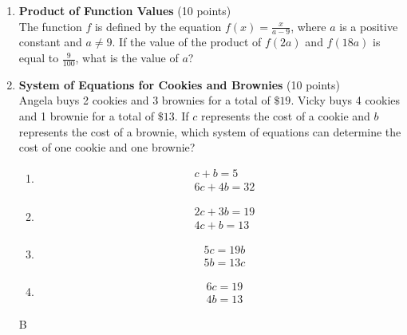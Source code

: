 \begin{enumerate}
  \item \textbf{Product of Function Values} (10 points)\\
  The function $f$ is defined by the equation $f(x) = \frac{x}{a-9}$, where $a$ is a positive constant and $a \neq 9$. If the value of the product of $f(2a)$ and $f(18a)$ is equal to $\frac{9}{100}$, what is the value of $a$?
  \begin{subanswer}
  \end{subanswer}



  
  \item \textbf{System of Equations for Cookies and Brownies} (10 points)\\
  Angela buys 2 cookies and 3 brownies for a total of $\$19$. Vicky buys 4 cookies and 1 brownie for a total of $\$13$. If $c$ represents the cost of a cookie and $b$ represents the cost of a brownie, which system of equations can determine the cost of one cookie and one brownie?
  \begin{enumerate}[label=(\Alph*)]
    \item 
    \[
      \begin{aligned}
      & c+b=5 \\
      & 6c+4b=32
      \end{aligned}
    \]
    \item 
    \[
      \begin{aligned}
      & 2c+3b=19 \\
      & 4c+b=13
      \end{aligned}
    \]
    \item 
    \[
      \begin{aligned}
      & 5c=19b \\
      & 5b=13c
      \end{aligned}
    \]
    \item 
    \[
      \begin{aligned}
      & 6c=19 \\
      & 4b=13
      \end{aligned}
    \]
  \end{enumerate}
  \begin{subanswer}
    B
  \end{subanswer}






\end{enumerate}
